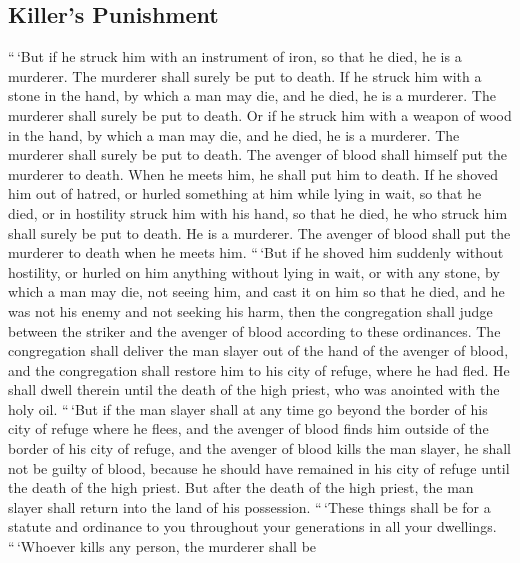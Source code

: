 \hypertarget{killers-punishment}{%
\subsection{Killer's Punishment}\label{killers-punishment}}

 ``\,`But if he struck him with an instrument of iron, so
that he died, he is a murderer. The murderer shall surely be put to
death.  If he struck him with a stone in the hand, by
which a man may die, and he died, he is a murderer. The murderer shall
surely be put to death.  Or if he struck him with a
weapon of wood in the hand, by which a man may die, and he died, he is a
murderer. The murderer shall surely be put to death.  The
avenger of blood shall himself put the murderer to death. When he meets
him, he shall put him to death.  If he shoved him out of
hatred, or hurled something at him while lying in wait, so that he died,
 or in hostility struck him with his hand, so that he
died, he who struck him shall surely be put to death. He is a murderer.
The avenger of blood shall put the murderer to death when he meets him.
 ``\,`But if he shoved him suddenly without hostility, or
hurled on him anything without lying in wait,  or with
any stone, by which a man may die, not seeing him, and cast it on him so
that he died, and he was not his enemy and not seeking his harm,
 then the congregation shall judge between the striker
and the avenger of blood according to these ordinances. 
The congregation shall deliver the man slayer out of the hand of the
avenger of blood, and the congregation shall restore him to his city of
refuge, where he had fled. He shall dwell therein until the death of the
high priest, who was anointed with the holy oil. 
``\,`But if the man slayer shall at any time go beyond the border of his
city of refuge where he flees,  and the avenger of blood
finds him outside of the border of his city of refuge, and the avenger
of blood kills the man slayer, he shall not be guilty of blood,
 because he should have remained in his city of refuge
until the death of the high priest. But after the death of the high
priest, the man slayer shall return into the land of his possession.
 ``\,`These things shall be for a statute and ordinance
to you throughout your generations in all your dwellings.
 ``\,`Whoever kills any person, the murderer shall be
